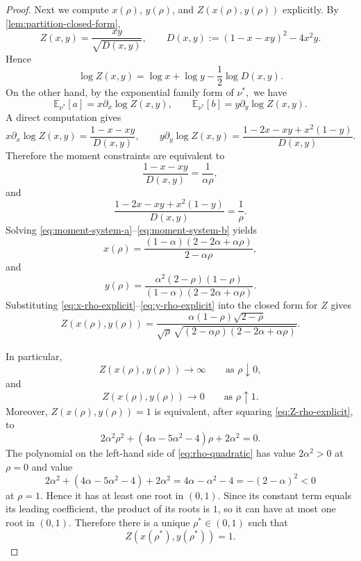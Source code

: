 \documentclass[11pt]{amsart}
\numberwithin{equation}{section}
\numberwithin{equation}{section}
\newcommand{\1}{\mathbbm{1}}
\newcommand{\E}{\mathbb{E}}
\theoremstyle{definition}
\begin{document}
\begin{proof}
Next we compute \(x(\rho)\), \(y(\rho)\), and \(Z(x(\rho),y(\rho))\) explicitly.
By \cref{lem:partition-closed-form},
\[
Z(x,y)=\frac{xy}{\sqrt{D(x,y)}},
\qquad
D(x,y):=(1-x-xy)^2-4x^2y.
\]
Hence
\[
\log Z(x,y)=\log x+\log y-\frac12\log D(x,y).
\]
On the other hand, by the exponential family form of $\nu^*,$ we have
\[
\E_{\nu^*}[a]=x\partial_x\log Z(x,y),
\qquad
\E_{\nu^*}[b]=y\partial_y\log Z(x,y).
\]
A direct computation gives
\[
x\partial_x\log Z(x,y)=\frac{1-x-xy}{D(x,y)},
\qquad
y\partial_y\log Z(x,y)=\frac{1-2x-xy+x^2(1-y)}{D(x,y)}.
\]
Therefore the moment constraints are equivalent to
\begin{equation}\label{eq:moment-system-a}
    \frac{1-x-xy}{D(x,y)}=\frac{1}{\alpha\rho},
\end{equation}
and
\begin{equation}\label{eq:moment-system-b}
    \frac{1-2x-xy+x^2(1-y)}{D(x,y)}=\frac{1}{\rho}.
\end{equation}
Solving \eqref{eq:moment-system-a}--\eqref{eq:moment-system-b} yields
\begin{equation}\label{eq:x-rho-explicit}
    x(\rho)=\frac{(1-\alpha)(2-2\alpha+\alpha\rho)}{2-\alpha\rho},
\end{equation}
and
\begin{equation}\label{eq:y-rho-explicit}
    y(\rho)=\frac{\alpha^2(2-\rho)(1-\rho)}{(1-\alpha)(2-2\alpha+\alpha\rho)}.
\end{equation}
Substituting \eqref{eq:x-rho-explicit}--\eqref{eq:y-rho-explicit} into the
closed form for \(Z\) gives
\begin{equation}\label{eq:Z-rho-explicit}
    Z(x(\rho),y(\rho))
    =
    \frac{\alpha(1-\rho)\sqrt{2-\rho}}
    {\sqrt{\rho}\,\sqrt{(2-\alpha\rho)(2-2\alpha+\alpha\rho)}}.
\end{equation}

In particular,
\[
Z(x(\rho),y(\rho))\longrightarrow\infty
\qquad\text{as }\rho\downarrow 0,
\]
and
\[
Z(x(\rho),y(\rho))\longrightarrow 0
\qquad\text{as }\rho\uparrow 1.
\]
Moreover, \(Z(x(\rho),y(\rho))=1\) is equivalent, after squaring
\eqref{eq:Z-rho-explicit}, to
\begin{equation}\label{eq:rho-quadratic}
    2\alpha^2\rho^2+(4\alpha-5\alpha^2-4)\rho+2\alpha^2=0.
\end{equation}
The polynomial on the left-hand side of \eqref{eq:rho-quadratic} has value
\(2\alpha^2>0\) at \(\rho=0\) and value
\[
2\alpha^2+(4\alpha-5\alpha^2-4)+2\alpha^2
=
4\alpha-\alpha^2-4
=
-(2-\alpha)^2<0
\]
at \(\rho=1\). Hence it has at least one root in \((0,1)\). Since its constant
term equals its leading coefficient, the product of its roots is \(1\), so it
can have at most one root in \((0,1)\). Therefore there is a unique
\(\rho^*\in(0,1)\) such that
\[
Z(x(\rho^*),y(\rho^*))=1.
\]


\end{proof}
\end{document}
